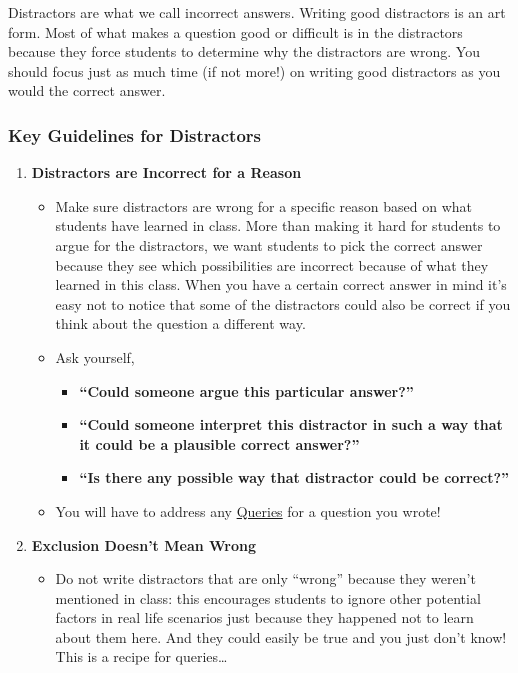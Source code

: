 \documentclass[
]{article}
\providecommand{\tightlist}{%
  \setlength{\itemsep}{0pt}\setlength{\parskip}{0pt}}
\begin{document}
Distractors are what we call incorrect answers. Writing good distractors is an art form. Most of what makes a question good or difficult is in the distractors because they force students to determine why the distractors are wrong. You should focus just as much time (if not more!) on writing good distractors as you would the correct answer.

\hypertarget{key-guidelines-for-distractors}{%
\subsubsection{Key Guidelines for Distractors}\label{key-guidelines-for-distractors}}

\begin{enumerate}
\def\labelenumi{\arabic{enumi}.}
\tightlist
\item
  \textbf{Distractors are Incorrect for a Reason}

  \begin{itemize}
  \tightlist
  \item
    Make sure distractors are wrong for a specific reason based on what students have learned in class. More than making it hard for students to argue for the distractors, we want students to pick the correct answer because they see which possibilities are incorrect because of what they learned in this class. When you have a certain correct answer in mind it's easy not to notice that some of the distractors could also be correct if you think about the question a different way.
  \item
    Ask yourself,

    \begin{itemize}
    \tightlist
    \item
      \textbf{``Could someone argue this particular answer?''}
    \item
      \textbf{``Could someone interpret this distractor in such a way that it could be a plausible correct answer?''}
    \item
      \textbf{``Is there any possible way that distractor could be correct?''}\\
    \end{itemize}
  \item
    You will have to address any \protect\hyperlink{benchmark-queries}{Queries} for a question you wrote!
  \end{itemize}
\item
  \textbf{Exclusion Doesn't Mean Wrong}

  \begin{itemize}
  \tightlist
  \item
    Do not write distractors that are only ``wrong'' because they weren't mentioned in class: this encourages students to ignore other potential factors in real life scenarios just because they happened not to learn about them here. And they could easily be true and you just don't know! This is a recipe for queries\ldots{}


\end{itemize}
\end{enumerate}
\end{document}

